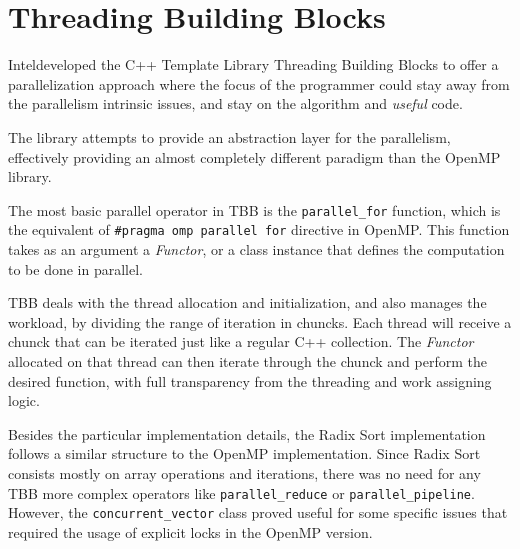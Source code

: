 \section{Threading Building Blocks}
\label{sec:500}

Intel\tr developed the C++ Template Library Threading Building Blocks to offer a parallelization approach where the focus of the programmer could stay away from the parallelism intrinsic issues, and stay on the algorithm and \textit{useful} code.

The library attempts to provide an abstraction layer for the parallelism, effectively providing an almost completely different paradigm than the OpenMP library.

The most basic parallel operator in TBB is the \texttt{parallel\_for} function, which is the equivalent of \texttt{\#pragma omp parallel for} directive in OpenMP. This function takes as an argument a \textit{Functor}, or a class instance that defines the computation to be done in parallel.

TBB deals with the thread allocation and initialization, and also manages the workload, by dividing the range of iteration in chuncks. Each thread will receive a chunck that can be iterated just like a regular C++ collection. The \textit{Functor} allocated on that thread can then iterate through the chunck and perform the desired function, with full transparency from the threading and work assigning logic.

Besides the particular implementation details, the Radix Sort implementation follows a similar structure to the OpenMP implementation. Since Radix Sort consists mostly on array operations and iterations, there was no need for any TBB more complex operators like \texttt{parallel\_reduce} or \texttt{parallel\_pipeline}. However, the \texttt{concurrent\_vector} class proved useful for some specific issues that required the usage of explicit locks in the OpenMP version.